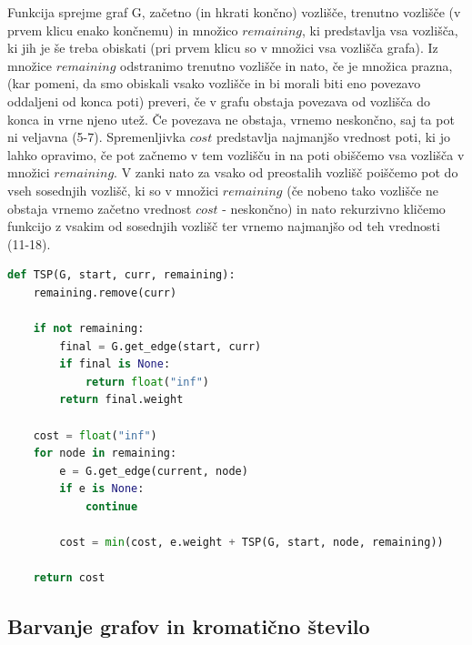 \documentclass[11pt]{article}
\begin{document}
Funkcija sprejme graf G, začetno (in hkrati končno) vozlišče, trenutno vozlišče (v prvem klicu enako končnemu) in množico $remaining$, ki predstavlja vsa vozlišča, ki jih je še treba obiskati (pri prvem klicu so v množici vsa vozlišča grafa). Iz množice $remaining$ odstranimo trenutno vozlišče in nato, če je množica prazna, (kar pomeni, da smo obiskali vsako vozlišče in bi morali biti eno povezavo oddaljeni od konca poti) preveri, če v grafu obstaja povezava od vozlišča do konca in vrne njeno utež. Če povezava ne obstaja, vrnemo neskončno, saj ta pot ni veljavna (5-7). Spremenljivka $cost$ predstavlja najmanjšo vrednost poti, ki jo lahko opravimo, če pot začnemo v tem vozlišču in na poti obiščemo vsa vozlišča v množici $remaining$. V zanki nato za vsako od preostalih vozlišč poiščemo pot do vseh sosednjih vozlišč, ki so v množici $remaining$ (če nobeno tako vozlišče ne obstaja vrnemo začetno vrednost $cost$ - neskončno) in nato rekurzivno kličemo funkcijo z vsakim od sosednjih vozlišč ter vrnemo najmanjšo od teh vrednosti (11-18). \cite{TSP}


\begin{lstlisting}[language=Python, caption=Problem trgovskega potnika]
def TSP(G, start, curr, remaining):
    remaining.remove(curr)
    
    if not remaining:
        final = G.get_edge(start, curr)
        if final is None:
            return float("inf")
        return final.weight
    
    cost = float("inf")
    for node in remaining:
        e = G.get_edge(current, node)
        if e is None:
            continue
        
        cost = min(cost, e.weight + TSP(G, start, node, remaining))
        
    return cost

\end{lstlisting}

\subsection{Barvanje grafov in kromatično število}
\end{document}
